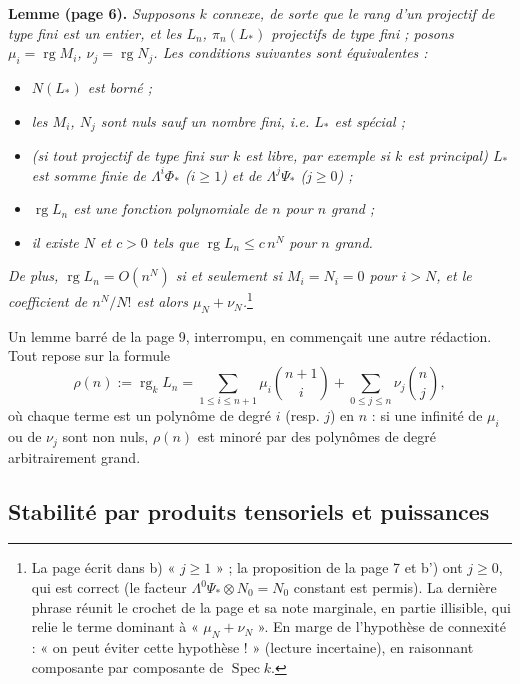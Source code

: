 \documentclass[11pt,a4paper]{article}
\begin{document}
\textbf{Lemme (page 6).} \emph{Supposons $k$ connexe, de sorte que le rang
d'un projectif de type fini est un entier, et les $L_{n}$, $\pi_{n}(L_{*})$
projectifs de type fini ; posons $\mu_{i} = \operatorname{rg} M_{i}$,
$\nu_{j} = \operatorname{rg} N_{j}$. Les conditions suivantes sont
équivalentes :}
\begin{itemize}
\item[a)] \emph{$N(L_{*})$ est borné ;}
\item[b)] \emph{les $M_{i}$, $N_{j}$ sont nuls sauf un nombre fini, i.e.
$L_{*}$ est spécial ;}
\item[b')] \emph{(si tout projectif de type fini sur $k$ est libre, par
exemple si $k$ est principal) $L_{*}$ est somme finie de
$\Lambda^{i}\Phi_{*}$ ($i \geqslant 1$) et de $\Lambda^{j}\Psi_{*}$
($j \geqslant 0$) ;}
\item[c)] \emph{$\operatorname{rg} L_{n}$ est une fonction polynomiale de $n$
pour $n$ grand ;}
\item[d)] \emph{il existe $N$ et $c > 0$ tels que
$\operatorname{rg} L_{n} \leqslant c\, n^{N}$ pour $n$ grand.}
\end{itemize}
\emph{De plus, $\operatorname{rg} L_{n} = O(n^{N})$ si et seulement si
$M_{i} = N_{i} = 0$ pour $i > N$, et le coefficient de $n^{N}/N!$ est alors
$\mu_{N} + \nu_{N}$.}\footnote{La page écrit dans b) « $j \geqslant 1$ » ;
la proposition de la page 7 et b') ont $j \geqslant 0$, qui est correct (le
facteur $\Lambda^{0}\Psi_{*} \otimes N_{0} = N_{0}$ constant est permis). La
dernière phrase réunit le crochet de la page et sa note marginale, en partie
illisible, qui relie le terme dominant à « $\mu_{N} + \nu_{N}$ ». En marge de
l'hypothèse de connexité : « on peut éviter cette hypothèse ! » (lecture
incertaine), en raisonnant composante par composante de
$\operatorname{Spec} k$.}

Un lemme barré de la page 9, interrompu, en commençait une autre rédaction. Tout repose sur la formule
\[
  \rho(n) := \operatorname{rg}_{k} L_{n} = \sum_{1 \leqslant i \leqslant n+1}
  \mu_{i} \binom{n+1}{i} + \sum_{0 \leqslant j \leqslant n} \nu_{j}
  \binom{n}{j},
\]
où chaque terme est un polynôme de degré $i$ (resp. $j$) en $n$ : si une
infinité de $\mu_{i}$ ou de $\nu_{j}$ sont non nuls, $\rho(n)$ est minoré par
des polynômes de degré arbitrairement grand.

\subsection*{Stabilité par produits tensoriels et puissances}
\end{document}
